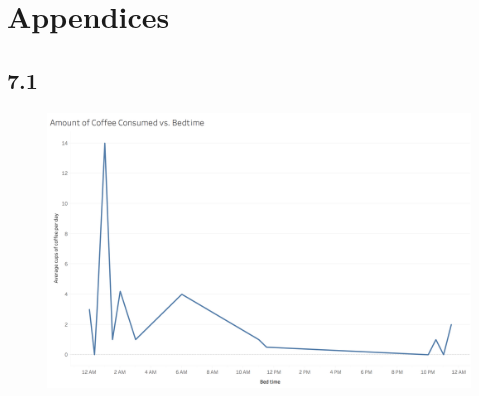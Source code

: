 \documentclass{neu_handout}
\begin{document}
\appendix
\section{Appendices}

\subsection*{7.1}
\begin{figure}[h]
\centering
{
\includegraphics[width=0.7\linewidth]{bedtime_coffee}
}
\end{figure}
\end{document}
